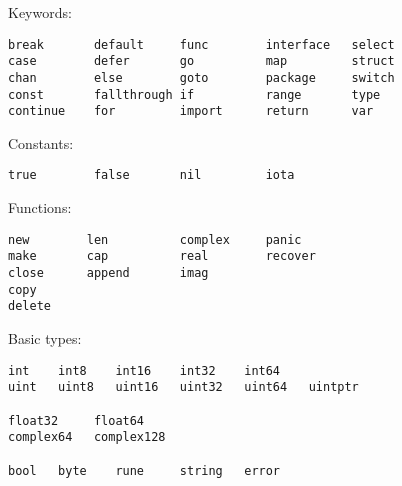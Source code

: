 \documentclass{beamer}
\begin{document}
	
	\begin{frame}[fragile]{}
		\begin{center}
			Keywords:
		\end{center}
		\begin{verbatim}
break       default     func        interface   select
case        defer       go          map         struct
chan        else        goto        package     switch
const       fallthrough if          range       type
continue    for         import      return      var
		\end{verbatim}
		\begin{center}
			Constants:
		\end{center}
		\begin{verbatim}
true        false       nil         iota
		\end{verbatim}
\end{frame}
	
	
	\begin{frame}[fragile]{}
		\begin{center}
			Functions:
		\end{center}
		\begin{verbatim}
new        len          complex     panic
make       cap          real        recover
close      append       imag
copy 
delete
		\end{verbatim}
\end{frame}
	
	
	\begin{frame}[fragile]{}
		\begin{center}
			Basic types:
		\end{center}
		\begin{verbatim}
int    int8    int16    int32    int64
uint   uint8   uint16   uint32   uint64   uintptr

float32     float64
complex64   complex128

bool   byte    rune     string   error
		\end{verbatim}
\end{frame}

\end{document}
